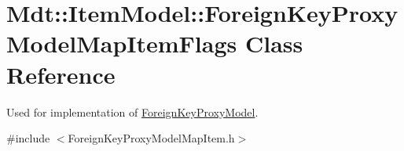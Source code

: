 \hypertarget{class_mdt_1_1_item_model_1_1_foreign_key_proxy_model_map_item_flags}{}\section{Mdt\+:\+:Item\+Model\+:\+:Foreign\+Key\+Proxy\+Model\+Map\+Item\+Flags Class Reference}
\label{class_mdt_1_1_item_model_1_1_foreign_key_proxy_model_map_item_flags}


Used for implementation of \hyperlink{class_mdt_1_1_item_model_1_1_foreign_key_proxy_model}{Foreign\+Key\+Proxy\+Model}.  




{\ttfamily \#include $<$Foreign\+Key\+Proxy\+Model\+Map\+Item.\+h$>$}

